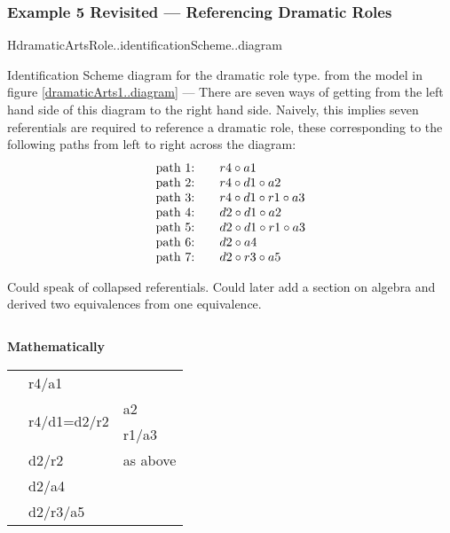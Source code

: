 \subsubsection{Example 5 Revisited --- Referencing Dramatic Roles}
\begin{worktt} 
\begin{erboxedFigure}{H}{dramaticArtsRole..identificationScheme..diagram}
{Identification Scheme diagram for the dramatic role type.
from the model in figure \ref{dramaticArts1..diagram} ---
There are seven ways of getting from the left hand side of this diagram to the right hand side. Naively, this implies seven referentials are required to reference a dramatic role, these corresponding to the following paths from left to right across the diagram:
\begin{displaymath}
\begin{array}{l c l}
\text{path 1:} &  & r4 \circ a1 \\
\text{path 2:} & & r4 \circ d1 \circ a2 \\
\text{path 3:} & & r4 \circ d1 \circ r1 \circ a3 \\
\text{path 4:} &  & d2 \circ d1 \circ a2 \\
\text{path 5:} &  & d2 \circ d1 \circ r1 \circ a3 \\
\text{path 6:} &  & d2 \circ a4 \\
\text{path 7:} &  & d2 \circ r3 \circ a5
\end{array}
\end{displaymath}


Could speak of collapsed referentials.
Could later add a section on algebra and derived two equivalences from one equivalence.
} %
\begin{equation*}

\end{equation*}
\end{erboxedFigure}
\mynote

\textbf{Mathematically}
\begin{tabular}{l l l}
& r4/a1 &    \\
& \multirow[t]{2}{1cm}{r4/d1=d2/r2} & a2  \\
&                                 & r1/a3 \\
& d2/r2    & as above\\
& d2/a4 &            \\
& d2/r3/a5 &      
\end{tabular}

\end{worktt}



